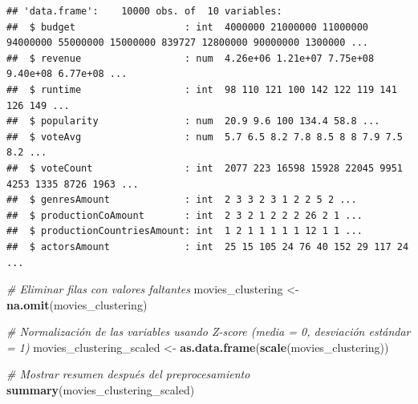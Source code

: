 \documentclass[
]{article}
\newenvironment{Shaded}{\begin{snugshade}}{\end{snugshade}}
\newcommand{\CommentTok}[1]{\textcolor[rgb]{0.56,0.35,0.01}{\textit{#1}}}
\newcommand{\FunctionTok}[1]{\textcolor[rgb]{0.13,0.29,0.53}{\textbf{#1}}}
\newcommand{\NormalTok}[1]{#1}
\newcommand{\OtherTok}[1]{\textcolor[rgb]{0.56,0.35,0.01}{#1}}
\begin{document}
\begin{verbatim}
## 'data.frame':    10000 obs. of  10 variables:
##  $ budget                   : int  4000000 21000000 11000000 94000000 55000000 15000000 839727 12800000 90000000 1300000 ...
##  $ revenue                  : num  4.26e+06 1.21e+07 7.75e+08 9.40e+08 6.77e+08 ...
##  $ runtime                  : int  98 110 121 100 142 122 119 141 126 149 ...
##  $ popularity               : num  20.9 9.6 100 134.4 58.8 ...
##  $ voteAvg                  : num  5.7 6.5 8.2 7.8 8.5 8 8 7.9 7.5 8.2 ...
##  $ voteCount                : int  2077 223 16598 15928 22045 9951 4253 1335 8726 1963 ...
##  $ genresAmount             : int  2 3 3 2 3 1 2 2 5 2 ...
##  $ productionCoAmount       : int  2 3 2 1 2 2 2 26 2 1 ...
##  $ productionCountriesAmount: int  1 2 1 1 1 1 1 12 1 1 ...
##  $ actorsAmount             : int  25 15 105 24 76 40 152 29 117 24 ...
\end{verbatim}

\begin{Shaded}
\begin{Highlighting}[]
\CommentTok{\# Eliminar filas con valores faltantes}
\NormalTok{movies\_clustering }\OtherTok{\textless{}{-}} \FunctionTok{na.omit}\NormalTok{(movies\_clustering)}

\CommentTok{\# Normalización de las variables usando Z{-}score (media = 0, desviación estándar = 1)}
\NormalTok{movies\_clustering\_scaled }\OtherTok{\textless{}{-}} \FunctionTok{as.data.frame}\NormalTok{(}\FunctionTok{scale}\NormalTok{(movies\_clustering))}

\CommentTok{\# Mostrar resumen después del preprocesamiento}
\FunctionTok{summary}\NormalTok{(movies\_clustering\_scaled)}
\end{Highlighting}
\end{Shaded}
\end{document}
